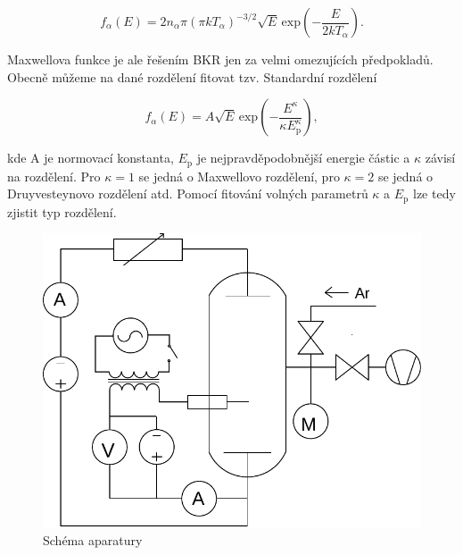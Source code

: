 \documentclass[12pt]{article}
\begin{document}
\begin{equation}
f_\alpha (E) = 2 n_\alpha \pi ( \pi k T_\alpha)^{-3/2} \sqrt{E}\, \mathrm{exp} (-\frac{E}{2kT_\alpha}) \mathrm{.}
\end{equation}

Maxwellova funkce je ale řešením BKR jen za velmi omezujících předpokladů. Obecně můžeme na dané rozdělení fitovat tzv. Standardní rozdělení 

\begin{equation}
f_\alpha (E) = A \sqrt{E} \, \mathrm{exp} (-\frac{E^\kappa}{\kappa E_\mathrm{p}^\kappa}) \mathrm{,}
\end{equation}

kde A je normovací konstanta, $E_\mathrm{p}$ je nejpravděpodobnější energie částic a $\kappa$ závisí na rozdělení. Pro $\kappa = 1$ se jedná o Maxwellovo rozdělení, pro $\kappa = 2$ se jedná o Druyvesteynovo rozdělení atd. Pomocí fitování volných parametrů $\kappa$ a $E_\mathrm{p}$ lze tedy zjistit typ rozdělení.

\begin{figure}[htbp]
\begin{center}
\includegraphics[width=12cm]{schema.pdf}
\caption{Schéma aparatury}
\label{schema}
\end{center}
\end{figure}
\end{document}
